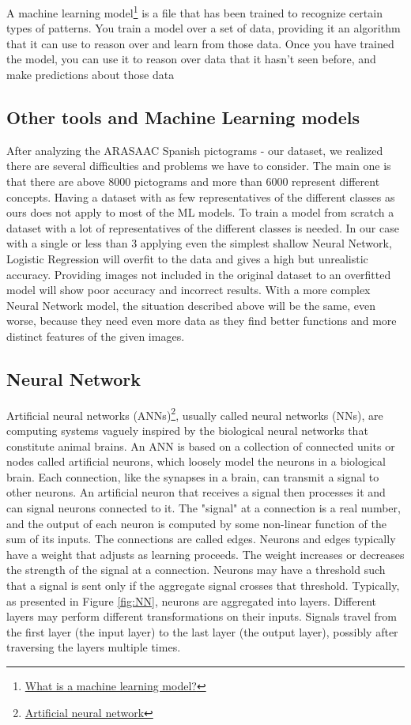 A machine learning model\footnote{\href{https://docs.microsoft.com/en-us/windows/ai/windows-ml/what-is-a-machine-learning-model}{What is a machine learning model?}} is a file that has been trained to recognize certain types of patterns. You train a model over a set of data, providing it an algorithm that it can use to reason over and learn from those data.
Once you have trained the model, you can use it to reason over data that it hasn't seen before, and make predictions about those data

\subsection{Other tools and Machine Learning models}
After analyzing the ARASAAC Spanish pictograms - our dataset, we realized there are several difficulties and problems we have to consider. The main one is that there are above 8000 pictograms and more than 6000 represent different concepts. 
Having a dataset with as few representatives of the different classes as ours does not apply to most of the ML models. To train a model from scratch a dataset with a lot of representatives of the different classes is needed. In our case with a single or less than 3 applying even the simplest shallow Neural Network, Logistic Regression will overfit to the data and gives a high but unrealistic accuracy. Providing images not included in the original dataset to an overfitted model will show poor accuracy and incorrect results. With a more complex Neural Network model, the situation described above  will be the same, even worse, because they need even more data as they find better functions and more distinct features of the given images.

\subsection{Neural Network}
Artificial neural networks (ANNs)\footnote{\href{https://en.wikipedia.org/wiki/Artificial_neural_network}{Artificial neural network}}, usually called neural networks (NNs), are computing systems vaguely inspired by the biological neural networks that constitute animal brains.
An ANN is based on a collection of connected units or nodes called artificial neurons, which loosely model the neurons in a biological brain. Each connection, like the synapses in a brain, can transmit a signal to other neurons. An artificial neuron that receives a signal then processes it and can signal neurons connected to it. The "signal" at a connection is a real number, and the output of each neuron is computed by some non-linear function of the sum of its inputs. The connections are called edges. Neurons and edges typically have a weight that adjusts as learning proceeds. The weight increases or decreases the strength of the signal at a connection. Neurons may have a threshold such that a signal is sent only if the aggregate signal crosses that threshold. Typically, as presented in Figure \ref{fig:NN}, neurons are aggregated into layers. Different layers may perform different transformations on their inputs. Signals travel from the first layer (the input layer) to the last layer (the output layer), possibly after traversing the layers multiple times.
   
